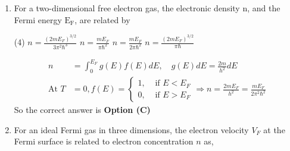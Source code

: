 \begin{enumerate}
\begin{tasks}(4)
\task[\textbf{A.}] $T^{\alpha-2}$
\task[\textbf{B.}] $T^{\frac{\alpha}{2}}$
\task[\textbf{C.}] $T^{\alpha-1}$
\task[\textbf{D.}] $T^{\alpha}$
\end{tasks}
\begin{answer}
\begin{align*}
(\Delta E)^{2}&=k T^{2} C_{V} \Rightarrow T^{\alpha-2} \propto C_{V} \\&\Rightarrow T^{\alpha-2} \propto\left(\frac{\partial U}{\partial T}\right)_{V} \Rightarrow U \propto T^{\alpha-1}
\end{align*}
So the correct answer is \textbf{Option (C)}
\end{answer}
\item For a two-dimensional free electron gas, the electronic density $\mathrm{n}$, and the Fermi energy $\mathrm{E}_{\mathrm{F}}$, are related by
{}

\begin{tasks}(4)
\task[\textbf{A.}] $n=\frac{\left(2 m E_{F}\right)^{3 / 2}}{3 \pi^{2} \hbar^{3}}$
\task[\textbf{B.}] $n=\frac{m E_{F}}{\pi \hbar^{2}}$
\task[\textbf{C.}] $n=\frac{m E_{F}}{2 \pi \hbar^{2}}$
\task[\textbf{D.}] $n=\frac{\left(2 m E_{F}\right)^{3 / 2}}{\pi \hbar}$
\end{tasks}
\begin{answer}
\begin{align*}
n&=\int_{0}^{E_{F}} g(E) f(E) d E, \quad g(E) d E=\frac{2 m}{h^{2}} d E\\
\text{At }T&=0, f(E)=\left\{\begin{array}{ll}1, & \text { if } E<E_{F} \\ 0, & \text { if } E>E_{F}\end{array} \Rightarrow n=\frac{2 m E_{F}}{h^{2}}=\frac{m E_{F}}{2 \pi^{2} \hbar^{2}}\right.
\end{align*}
So the correct answer is \textbf{Option (C)}
\end{answer}
	\item For an ideal Fermi gas in three dimensions, the electron velocity $V_{F}$ at the Fermi surface is related to electron concentration $n$ as,
{}


\end{enumerate}
